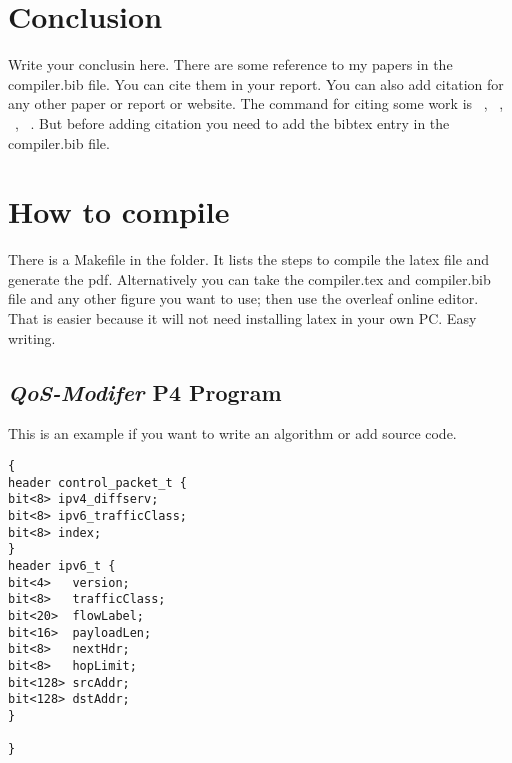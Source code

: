 \section{Conclusion}  \label{Conclusion}
Write your conclusin here. There are some reference to my papers in the compiler.bib file. You can cite them in your report. You can
also add citation for any other paper or report or website. The command for citing some work is 
~\cite{robin2022clb}, ~\cite{robin2021p4kp}, ~\cite{robin2022p4te}, ~\cite{robin2022preprint}. But before adding citation you need to add the bibtex entry in the compiler.bib file. 


\section{How to compile} 
There is a Makefile in the folder. It lists the steps to compile the latex file and generate the pdf. Alternatively you can take the 
compiler.tex and compiler.bib file and any other figure you want to use; then use the overleaf online editor. That is easier because it will not need
installing latex in your own PC. Easy writing. 







\appendix
\subsection{\textit{QoS-Modifer} P4 Program}\label{App:QoSModiferP4Program}
This is an example if you want to write an algorithm or add source code. 

\small{
\begin{lstlisting}[linewidth=\columnwidth,breaklines=true,frame = single]
{
header control_packet_t {
bit<8> ipv4_diffserv;
bit<8> ipv6_trafficClass;
bit<8> index;
}
header ipv6_t {
bit<4>   version;
bit<8>   trafficClass;
bit<20>  flowLabel;
bit<16>  payloadLen;
bit<8>   nextHdr;
bit<8>   hopLimit;
bit<128> srcAddr;
bit<128> dstAddr;
}

}
\end{lstlisting}
}














